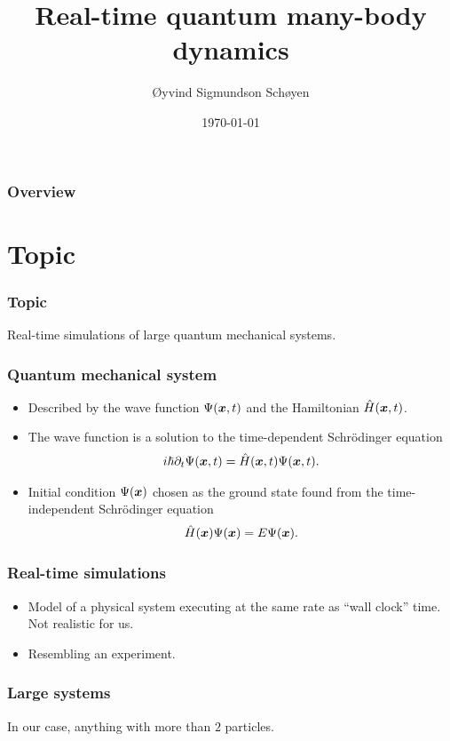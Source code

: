 \documentclass{beamer}
\author{Øyvind Sigmundson Schøyen}
\title{Real-time quantum many-body dynamics}
\institute{University of Oslo}
\date{\today}
\begin{document}
\begin{frame}
    \titlepage
\end{frame}

\begin{frame}
    \frametitle{Overview}
    \tableofcontents
\end{frame}

\section{Topic}

\begin{frame}
    \frametitle{Topic}
    Real-time simulations of large quantum mechanical systems.
\end{frame}

\begin{frame}
    \frametitle{Quantum mechanical system}
    \begin{itemize}
        \item Described by the wave function $\Psi(\boldsymbol{x}, t)$ and the Hamiltonian
            $\hat{H}(\boldsymbol{x}, t)$.
        \item The wave function is a solution to the time-dependent Schrödinger
            equation
            \begin{align}
                i\hslash \partial_t\Psi(\boldsymbol{x}, t)
                = \hat{H}(\boldsymbol{x}, t)\Psi(\boldsymbol{x}, t).
            \end{align}
        \item Initial condition $\Psi(\boldsymbol{x})$ chosen as the ground state found
            from the time-independent Schrödinger equation
            \begin{align}
                \hat{H}(\boldsymbol{x})\Psi(\boldsymbol{x}) = E\Psi(\boldsymbol{x}).
            \end{align}
    \end{itemize}
\end{frame}

\begin{frame}
    \frametitle{Real-time simulations}
    \begin{itemize}
        \item Model of a physical system executing at the same rate as ``wall
            clock'' time.
            Not realistic for us.
        \item Resembling an experiment.
    \end{itemize}
\end{frame}

\begin{frame}
    \frametitle{Large systems}
    In our case, anything with more than $2$ particles.
\end{frame}
\end{document}

